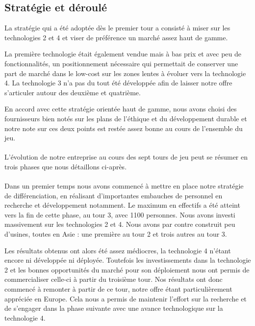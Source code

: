\documentclass[a4paper,11pt]{article}
\theoremstyle{remark}
\begin{document}
	\subsection{Stratégie et déroulé}

	La stratégie qui a été adoptée dès le premier tour a consisté à miser sur les technologies 2 et 4 et viser de préférence un marché assez haut de gamme.
	
	La première technologie était également vendue mais à bas prix et avec peu de fonctionnalités, un positionnement nécessaire qui permettait de conserver une part de marché dans le low-cost sur les zones lentes à évoluer vers la technologie 4.
	La technologie 3 n'a pas du tout été développée afin de laisser notre offre s'articuler autour des deuxième et quatrième.
	
	En accord avec cette stratégie orientée haut de gamme, nous avons choisi des fournisseurs bien notés sur les plans de l'éthique et du développement durable et notre note sur ces deux points est restée assez bonne au cours de l'ensemble du jeu.
	
	\paragraph{}
	L'évolution de notre entreprise au cours des sept tours de jeu peut se résumer en trois phases que nous détaillons ci-après.

	\paragraph{} %
	Dans un premier temps nous avons commencé à mettre en place notre stratégie de différenciation, en réalisant d'importantes embauches de personnel en recherche et développement notamment.
	Le maximum en effectifs a été atteint vers la fin de cette phase, au tour 3, avec 1100 personnes.
	Nous avons investi massivement sur les technologies 2 et 4.
	Nous avons par contre construit peu d'usines, toutes en Asie : une première au tour 2 et trois autres au tour 3.

	Les résultats obtenus ont alors été assez médiocres, la technologie 4 n'étant encore ni développée ni déployée.
	Toutefois les investissements dans la technologie 2 et les bonnes opportunités du marché pour son déploiement nous ont permis de commercialiser celle-ci à partir du troisième tour.
	Nos résultats ont donc commencé à remonter à partir de ce tour, notre offre étant particulièrement appréciée en Europe.
	Cela nous a permis de maintenir l'effort sur la recherche et de s'engager dans la phase suivante avec une avance technologique sur la technologie 4.
\end{document}
